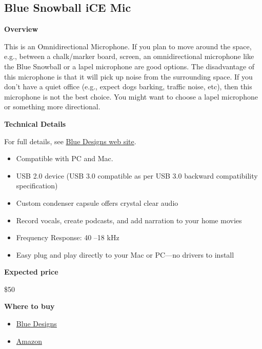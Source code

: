 \subsection{Blue Snowball iCE Mic}
\label{sec:bluesnow}

\begin{gram}
\label{grm:bluesnow::overview}

\textbf{Overview}

This is an Omnidirectional Microphone. If you plan to move around the
space, e.g., between a chalk/marker board, screen, an omnidirectional
microphone like the Blue Snowball or a lapel microphone are good
options.
%
The disadvantage of this microphone is that it will pick up noise from the surrounding space.
%
If you don't have a quiet office (e.g., expect dogs barking, traffic noise, etc), then this microphone is not the best choice.  
%
You might want to choose a lapel microphone or something more directional.




\textbf{Technical Details}

For full details, see \href{https://www.bluedesigns.com/products/snowball-ice/}{Blue Designs web site}.

\begin{itemize}
\item
Compatible with PC and Mac.

\item  USB 2.0 device (USB 3.0 compatible as per USB 3.0 backward compatibility specification)

\item Custom condenser capsule offers crystal clear audio

\item Record vocals, create podcasts, and add narration to your home movies

\item Frequency Response: 40 –18 kHz

\item Easy plug and play directly to your Mac or PC—no drivers to install
\end{itemize}



\textbf{Expected price}

\$50


\textbf{Where to buy}


\begin{itemize}
\item 
\href{https://www.bluedesigns.com/products/snowball-ice/}{Blue Designs}

\item 
\href{https://www.amazon.com/Blue-Snowball-Condenser-Microphone-Cardioid/dp/B006DIA77E/ref=sxin_2_ac_d_rm?ac_md=1-1-c25vd2JhbGwgbWljcm9waG9uZQ%3D%3D-ac_d_rm&crid=35T8W1KNGCU61&cv_ct_cx=blue+yeti+usb+microphone&keywords=blue+yeti+usb+microphone&pd_rd_i=B006DIA77E&pd_rd_r=3aa58f9d-30b3-4a94-a0f9-899d4ec51554&pd_rd_w=TANss&pd_rd_wg=OOiJB&pf_rd_p=ec111f65-4a46-499c-be78-f47997212bd0&pf_rd_r=BKY12JJMDCSM54ABWTDX&psc=1&qid=1582900292&sprefix=Blue+ye,aps,168}{Amazon}
\end{itemize}

\end{gram}

